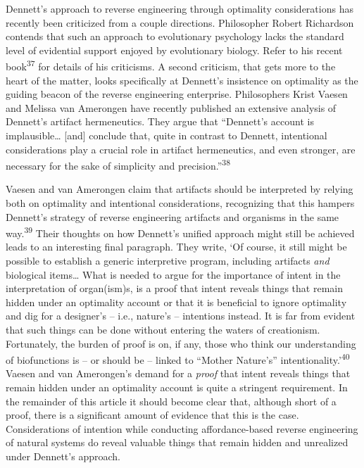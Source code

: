 Dennett’s approach to reverse engineering through optimality
considerations has recently been criticized from a couple directions.
Philosopher Robert Richardson contends that such an approach to
evolutionary psychology lacks the standard level of evidential support
enjoyed by evolutionary biology. Refer to his recent
book\textsuperscript{37} for details of his criticisms. A second
criticism, that gets more to the heart of the matter, looks
specifically at Dennett’s insistence on optimality as the guiding
beacon of the reverse engineering enterprise. Philosophers Krist Vaesen
and Melissa van Amerongen have recently published an extensive analysis
of Dennett’s artifact hermeneutics. They argue that “Dennett’s account
is implausible… [and] conclude that, quite in contrast to Dennett,
intentional considerations play a crucial role in artifact
hermeneutics, and even stronger, are necessary for the sake of
simplicity and precision.”\textsuperscript{38}


Vaesen and van Amerongen claim that artifacts should be interpreted by
relying both on optimality and intentional considerations, recognizing
that this hampers Dennett’s strategy of reverse engineering artifacts
and organisms in the same way.\textsuperscript{39} Their thoughts on
how Dennett’s unified approach might still be achieved leads to an
interesting final paragraph. They write, ‘Of course, it still might be
possible to establish a generic interpretive program, including
artifacts \textit{and} biological items… What is needed to argue for
the importance of intent in the interpretation of organ(ism)s, is a
proof that intent reveals things that remain hidden under an optimality
account or that it is beneficial to ignore optimality and dig for a
designer’s – i.e., nature’s – intentions instead. It is far from
evident that such things can be done without entering the waters of
creationism. Fortunately, the burden of proof is on, if any, those who
think our understanding of biofunctions is – or should be – linked to
“Mother Nature’s” intentionality.’\textsuperscript{40} Vaesen and van
Amerongen’s demand for a \textit{proof} that intent reveals things that
remain hidden under an optimality account is quite a stringent
requirement. In the remainder of this article it should become clear
that, although short of a proof, there is a significant amount of
evidence that this is the case. Considerations of intention while
conducting affordance-based reverse engineering of natural systems do
reveal valuable things that remain hidden and unrealized under
Dennett’s approach.


